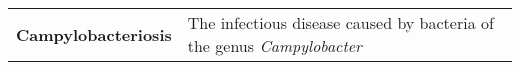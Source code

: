\begin{table}[ht!]
\begin{tabular}{lm{45em}}
 \textbf{Campylobacteriosis} & The infectious disease caused by bacteria of the genus \emph{Campylobacter} \\
\end{tabular}
\end{table}